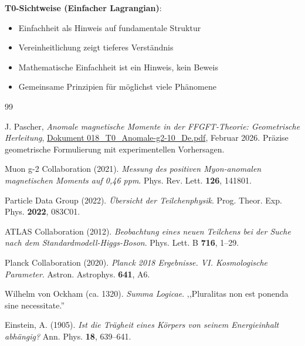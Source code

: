	\textbf{T0-Sichtweise (Einfacher Lagrangian)}:
	\begin{itemize}
		\item Einfachheit als Hinweis auf fundamentale Struktur
		\item Vereinheitlichung zeigt tieferes Verständnis
		\item Mathematische Einfachheit ist ein Hinweis, kein Beweis
		\item Gemeinsame Prinzipien für möglichst viele Phänomene
	\end{itemize}

\begin{thebibliography}{99}
		
		J. Pascher,
		\textit{Anomale magnetische Momente in der FFGFT-Theorie: Geometrische Herleitung},
		\href{https://github.com/jpascher/T0-Time-Mass-Duality/blob/main/2/pdf/018_T0_Anomale-g2-10_De.pdf}{Dokument 018\_T0\_Anomale-g2-10\_De.pdf},
		Februar 2026.
		Präzise geometrische Formulierung mit experimentellen Vorhersagen.
		
		Muon g-2 Collaboration (2021). \textit{Messung des positiven Myon-anomalen magnetischen Moments auf 0{,}46 ppm}. Phys. Rev. Lett. \textbf{126}, 141801.
		
		Particle Data Group (2022). \textit{Übersicht der Teilchenphysik}. Prog. Theor. Exp. Phys. \textbf{2022}, 083C01.
		
		ATLAS Collaboration (2012). \textit{Beobachtung eines neuen Teilchens bei der Suche nach dem Standardmodell-Higgs-Boson}. Phys. Lett. B \textbf{716}, 1--29.
		
		Planck Collaboration (2020). \textit{Planck 2018 Ergebnisse. VI. Kosmologische Parameter}. Astron. Astrophys. \textbf{641}, A6.
		
		Wilhelm von Ockham (ca. 1320). \textit{Summa Logicae}. ,,Pluralitas non est ponenda sine necessitate.''
		
		Einstein, A. (1905). \textit{Ist die Trägheit eines Körpers von seinem Energieinhalt abhängig?} Ann. Phys. \textbf{18}, 639--641.
		
	\end{thebibliography}
